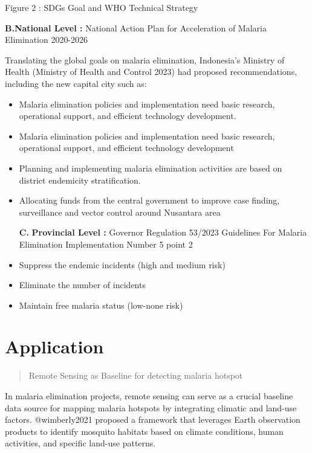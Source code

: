 \documentclass[
  letterpaper,
  DIV=11,
  numbers=noendperiod]{scrreprt}
\begin{document}
Figure 2 : SDGs Goal and WHO Technical Strategy

\textbf{B.National Level :} National Action Plan for Acceleration of
Malaria Elimination 2020-2026

Translating the global goals on malaria elimination, Indonesia's
Ministry of Health (Ministry of Health and Control 2023) had proposed
recommendations, including the new capital city such as:

\begin{itemize}
\item
  Malaria elimination policies and implementation need basic research,
  operational support, and efficient technology development.
\item
  Malaria elimination policies and implementation need basic research,
  operational support, and efficient technology development
\item
  Planning and implementing malaria elimination activities are based on
  district endemicity stratification.
\item
  Allocating funds from the central government to improve case finding,
  surveillance and vector control around Nusantara area

  \textbf{C.} \textbf{Provincial Level :} Governor Regulation 53/2023
  Guidelines For Malaria Elimination Implementation Number 5 point 2
\item
  Suppress the endemic incidents (high and medium risk)
\item
  Eliminate the number of incidents
\item
  Maintain free malaria status (low-none risk)
\end{itemize}

\hypertarget{application-2}{%
\section{Application}\label{application-2}}

\begin{quote}
Remote Sensing as Baseline for detecting malaria hotspot
\end{quote}

In malaria elimination projects, remote sensing can serve as a crucial
baseline data source for mapping malaria hotspots by integrating
climatic and land-use factors. @wimberly2021 proposed a framework that
leverages Earth observation products to identify mosquito habitats based
on climate conditions, human activities, and specific land-use patterns.
\end{document}
